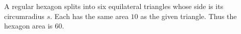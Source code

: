 A regular hexagon splits into six equilateral triangles whose side is its circumradius $s$. Each has the same area $10$ as the given triangle. Thus the hexagon area is $\boxed{60}$.
